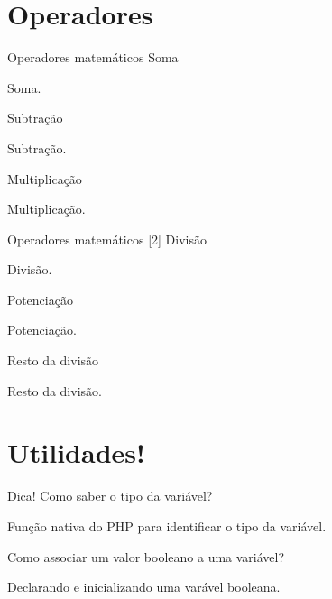 \documentclass{beamer}
\begin{document}
\section{Operadores}
\begin{frame}{Operadores matemáticos}
Soma
\begin{center}
		
		\tiny Soma.\\
	\end{center}


Subtração
\begin{center}
		
		\tiny Subtração.\\
	\end{center}
	
Multiplicação
\begin{center}
		
		\tiny Multiplicação.\\
\end{center}

\end{frame}

\begin{frame}{Operadores matemáticos [2]}
Divisão
\begin{center}
		
		\tiny Divisão.\\
	\end{center}


Potenciação
\begin{center}
		
		\tiny Potenciação.\\
	\end{center}
Resto da divisão
\begin{center}
		
		\tiny Resto da divisão.\\
\end{center}
\end{frame}
\section{Utilidades!}
\begin{frame}{Dica!}
Como saber o tipo da variável?
\begin{center}
		
		\tiny Função nativa do PHP para identificar o tipo da variável.\\
	\end{center}


Como associar um valor booleano a uma variável?
\begin{center}
		
		\tiny Declarando e inicializando uma varável booleana.\\
	\end{center}
\end{frame}
\end{document}
